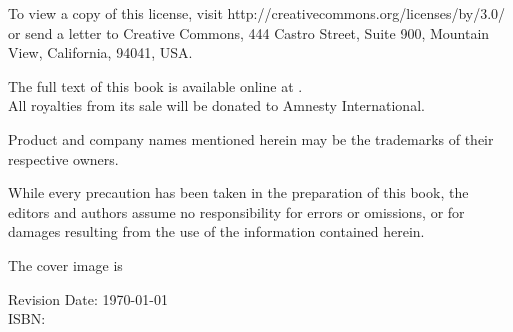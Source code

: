 \noindent
To view a copy of this license, visit
http://creativecommons.org/licenses/by/3.0/ or send a letter to Creative
Commons, 444 Castro Street, Suite 900, Mountain View, California,
94041, USA.\\

\vspace{0.15cm}

\noindent
The full text of this book is available online at .\\
All royalties from its sale will be donated to Amnesty International.\\

\vfill

\noindent Product and company names mentioned herein may be the trademarks of
their respective owners.\\

\vspace{0.15cm}

\noindent While every precaution has been taken in the preparation of this
book, the editors and authors assume no responsibility for errors or omissions,
or for damages resulting from the use of the information contained herein.\\

\vspace{0.15cm}

\noindent The cover image is \\

\vspace{1cm}

\noindent Revision Date: \today \\

\noindent ISBN: 
\normalsize

\newpage

\thispagestyle{empty}
\mbox{}    %

\newpage
\tableofcontents

